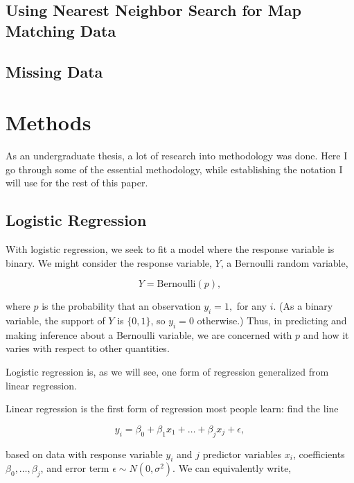 \documentclass[12pt,twoside]{reedthesis}
\begin{document}
  \section{Using Nearest Neighbor Search for Map Matching
  Data}\label{using-nearest-neighbor-search-for-map-matching-data}
  
  \section{Missing Data}\label{missing-data}
  
  \chapter{Methods}\label{methods}
  
  As an undergraduate thesis, a lot of research into methodology was done.
  Here I go through some of the essential methodology, while establishing
  the notation I will use for the rest of this paper.
  
  \section{Logistic Regression}\label{logistic-regression}
  
  With logistic regression, we seek to fit a model where the response
  variable is binary. We might consider the response variable, \(Y\), a
  Bernoulli random variable,
  
  \[Y = \text{Bernoulli}(p),\]
  
  where \(p\) is the probability that an observation \(y_i = 1,\) for any
  \(i\). (As a binary variable, the support of \(Y\) is \(\{0,1\}\), so
  \(y_i = 0\) otherwise.) Thus, in predicting and making inference about a
  Bernoulli variable, we are concerned with \(p\) and how it varies with
  respect to other quantities.
  
  Logistic regression is, as we will see, one form of regression
  generalized from linear regression.
  
  Linear regression is the first form of regression most people learn:
  find the line
  
  \[y_i = \beta_0 + \beta_1 x_1 + \ldots + \beta_j x_j + \epsilon,\]
  
  based on data with response variable \(y_i\) and \(j\) predictor
  variables \(x_i\), coefficients \(\beta_0, \ldots, \beta_j\), and error
  term \(\epsilon \sim N(0, \sigma^2)\). We can equivalently write,
  
\end{document}
